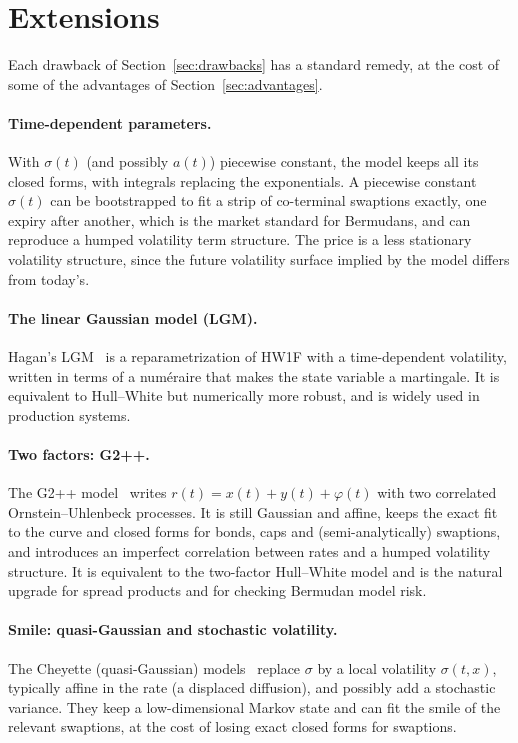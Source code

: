 \documentclass[11pt,a4paper]{article}
\theoremstyle{plain}
\theoremstyle{definition}
\begin{document}
\clearpage
\section{Extensions}
\label{sec:extensions}

Each drawback of Section~\ref{sec:drawbacks} has a standard remedy, at the cost of some of the advantages of Section~\ref{sec:advantages}.

\paragraph{Time-dependent parameters.} With $\sigma(t)$ (and possibly $a(t)$) piecewise constant, the model keeps all its closed forms, with integrals replacing the exponentials. A piecewise constant $\sigma(t)$ can be bootstrapped to fit a strip of co-terminal swaptions exactly, one expiry after another, which is the market standard for Bermudans, and can reproduce a humped volatility term structure. The price is a less stationary volatility structure, since the future volatility surface implied by the model differs from today's.

\paragraph{The linear Gaussian model (LGM).} Hagan's LGM~\cite{hagan} is a reparametrization of HW1F with a time-dependent volatility, written in terms of a numéraire that makes the state variable a martingale. It is equivalent to Hull--White but numerically more robust, and is widely used in production systems.

\paragraph{Two factors: G2++.} The G2++ model~\cite{brigomercurio} writes $r(t)=x(t)+y(t)+\varphi(t)$ with two correlated Ornstein--Uhlenbeck processes. It is still Gaussian and affine, keeps the exact fit to the curve and closed forms for bonds, caps and (semi-analytically) swaptions, and introduces an imperfect correlation between rates and a humped volatility structure. It is equivalent to the two-factor Hull--White model and is the natural upgrade for spread products and for checking Bermudan model risk.

\paragraph{Smile: quasi-Gaussian and stochastic volatility.} The Cheyette (quasi-Gaussian) models~\cite{cheyette, andersenpiterbarg} replace $\sigma$ by a local volatility $\sigma(t,x)$, typically affine in the rate (a displaced diffusion), and possibly add a stochastic variance. They keep a low-dimensional Markov state and can fit the smile of the relevant swaptions, at the cost of losing exact closed forms for swaptions.
\end{document}
